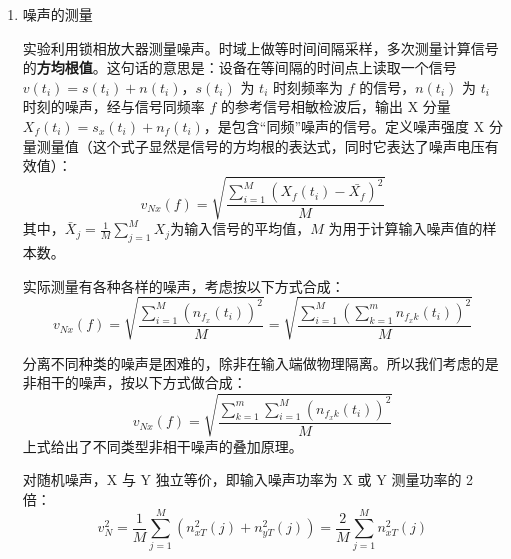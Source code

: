 \documentclass[dvipsnames, svgnames,a4paper,11pt]{article}
\begin{document}
\begin{enumerate}
\begin{enumerate}
			在低频极限$\omega \ll (RC)^{-1}$下，响应函数的虚部近似为
			\begin{equation*}
				\text{Im}\left[\chi(\omega)\right] \approx \omega RC^2 \, .
			\end{equation*}
			
			通过涨落-耗散定理，可以将其与电压的\textbf{功率谱密度}函数$S_V(\omega)$联系起来
			\begin{equation*}
				S_V(\omega) = \frac{S_Q(\omega)}{C^2} \approx \frac{2k_{\rm B}T}{C^2\omega} \text{Im}\left[\chi(\omega)\right] = 2Rk_{\rm B}T \, .
			\end{equation*}
			
			在带宽$\Delta f = \Delta\omega / (2\pi)$内观察到的约翰逊-奈奎斯特电压噪声$\langle V^2 \rangle$，中心频率为$\omega = \pm \omega_0$。因此
			\begin{equation*}
				\langle V^2 \rangle \approx S_V(\omega) \times 2\Delta f \approx 4Rk_{\rm B}T\Delta f \, .
			\end{equation*}
			
		\end{enumerate}
		
		\item 噪声的测量
		
		实验利用锁相放大器测量噪声。时域上做等时间间隔采样，多次测量计算信号的\textbf{方均根值}。这句话的意思是：设备在等间隔的时间点上读取一个信号 $v(t_i) = s(t_i) + n(t_i)$，$s(t_i)$ 为 $t_i$ 时刻频率为 $f$ 的信号，$n(t_i)$ 为 $t_i$ 时刻的噪声，经与信号同频率 $f$ 的参考信号相敏检波后，输出 X 分量$X_f(t_i) = s_x(t_i) + n_f(t_i)$，是包含“同频”噪声的信号。定义噪声强度 X 分量测量值（这个式子显然是信号的方均根的表达式，同时它表达了噪声电压有效值）：
		\[
		v_{Nx}(f) = \sqrt{\frac{\sum_{i=1}^{M} \left(X_f(t_i) - \bar{X_f}\right)^2}{M}}
		\]
		其中，$\bar{X}_j = \frac{1}{M} \sum_{j=1}^{M} X_j$为输入信号的平均值，$M$ 为用于计算输入噪声值的样本数。
		
		实际测量有各种各样的噪声，考虑按以下方式合成：
		\[
		v_{Nx}(f) = \sqrt{\frac{\sum_{i=1}^{M} \left( n_{f_x}(t_i) \right)^2}{M}} = \sqrt{\frac{\sum_{i=1}^{M} \left( \sum_{k=1}^{m} n_{f_xk}(t_i) \right)^2}{M}} 
		\]
		
		分离不同种类的噪声是困难的，除非在输入端做物理隔离。所以我们考虑的是非相干的噪声，按以下方式做合成：
		\[
		v_{Nx}(f) = \sqrt{\frac{\sum_{k=1}^{m} \sum_{i=1}^{M} \left( n_{f_xk}(t_i) \right)^2}{M}}
		\]
		上式给出了不同类型非相干噪声的叠加原理。
		
		对随机噪声，X 与 Y 独立等价，即输入噪声功率为 X 或 Y 测量功率的 2 倍：
		\[
		v_N^2 = \frac{1}{M} \sum_{j=1}^{M} \left( n_{xT}^2(j) + n_{yT}^2(j) \right) = \frac{2}{M} \sum_{j=1}^{M} n_{xT}^2(j)
		\]
		

\end{enumerate}
\end{document}
